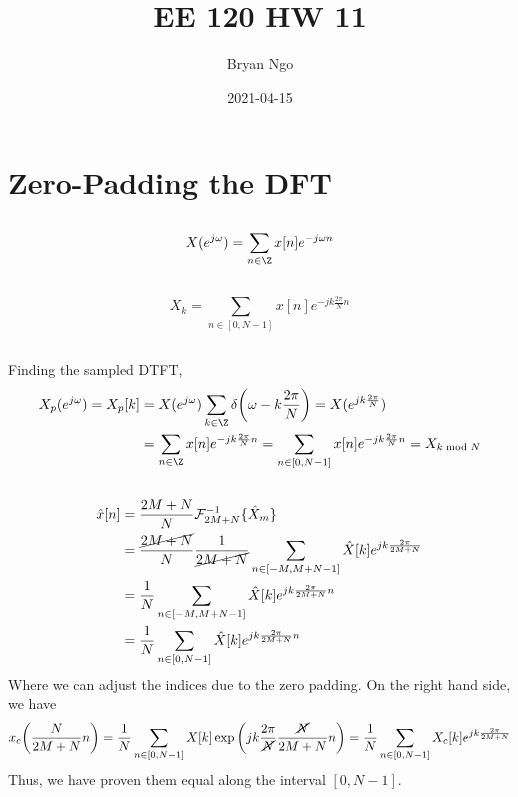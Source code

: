 \documentclass{article}
\title{EE 120 HW 11}
\author{Bryan Ngo}
\date{2021-04-15}
\begin{document}
\maketitle

\section{Zero-Padding the DFT}

\subsection{}

\begin{equation}
    X(e^{j \omega}) = \sum_{n \in \Z} x[n] e^{-j \omega n}
\end{equation}

\subsection{}

\begin{equation}
    X_k = \sum_{n \in [0, N - 1]} x[n] e^{-j k \frac{2\pi}{N} n}
\end{equation}

\subsection{}

Finding the sampled DTFT,
\begin{align}
    X_p(e^{j \omega}) = X_p[k] &= X(e^{j \omega}) \sum_{k \in \Z} \delta\qty(\omega - k\frac{2\pi}{N}) = X(e^{j k \frac{2\pi}{N}}) \\
    &= \sum_{n \in \Z} x[n] e^{-j k \frac{2\pi}{N} n} = \sum_{n \in [0, N - 1]} x[n] e^{-j k \frac{2\pi}{N} n} = X_{k \bmod N}
\end{align}

\subsection{}

\begin{align}
    \hat{x}[n] &= \frac{2M + N}{N} \mathcal{F}^{-1}_{2M + N}\{\hat{X}_m\} \\
    &= \frac{\cancel{2M + N}}{N} \frac{1}{\cancel{2M + N}} \sum_{n \in [-M, M + N - 1]} \hat{X}[k] e^{j k \frac{2\pi}{2M + N}} \\
    &= \frac{1}{N} \sum_{n \in [-M, M + N - 1]} \hat{X}[k] e^{j k \frac{2\pi}{2M + N} n} \\
    &= \frac{1}{N} \sum_{n \in [0, N - 1]} \hat{X}[k] e^{j k \frac{2\pi}{2M + N}n}
\end{align}
Where we can adjust the indices due to the zero padding.
On the right hand side, we have
\begin{equation}
    x_c\qty(\frac{N}{2M + N} n) = \frac{1}{N} \sum_{n \in [0, N - 1]} X[k] \exp\qty(j k \frac{2\pi}{\cancel{N}} \frac{\cancel{N}}{2M + N} n) = \frac{1}{N} \sum_{n \in [0, N - 1]} X_c[k] e^{j k \frac{2\pi}{2M + N}}
\end{equation}
Thus, we have proven them equal along the interval \([0, N - 1]\).
\end{document}
